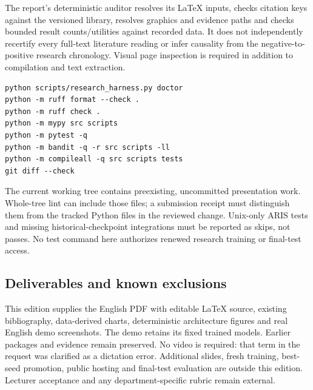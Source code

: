The report's deterministic auditor resolves its LaTeX inputs, checks citation
keys against the versioned library, resolves graphics and evidence paths and
checks bounded result counts/utilities against recorded data. It does not
independently recertify every full-text literature reading or infer causality
from the negative-to-positive research chronology. Visual page inspection is
required in addition to compilation and text extraction.

\begin{verbatim}
python scripts/research_harness.py doctor
python -m ruff format --check .
python -m ruff check .
python -m mypy src scripts
python -m pytest -q
python -m bandit -q -r src scripts -ll
python -m compileall -q src scripts tests
git diff --check
\end{verbatim}

The current working tree contains preexisting, uncommitted presentation work.
Whole-tree lint can include those files; a submission receipt must distinguish
them from the tracked Python files in the reviewed change. Unix-only ARIS tests
and missing historical-checkpoint integrations must be reported as skips, not
passes. No test command here authorizes renewed research training or final-test access.

\subsection{Deliverables and known exclusions}
This edition supplies the English PDF with editable LaTeX source, existing
bibliography, data-derived charts, deterministic architecture figures and real
English demo screenshots. The demo retains its fixed trained models. Earlier
packages and evidence remain preserved. No video is required: that term in the
request was clarified as a dictation error. Additional slides, fresh training,
best-seed promotion, public hosting and final-test evaluation are outside this
edition. Lecturer acceptance and any department-specific rubric remain external.
